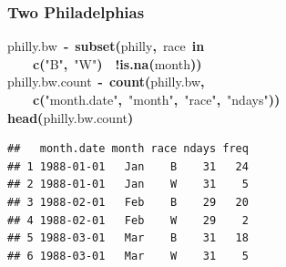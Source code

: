 \documentclass[]{beamer}
\makeatletter
\newcommand{\hlfunctioncall}[1]{\textcolor[rgb]{.5,0,.33}{\textbf{#1}}}%
\newcommand{\hlstring}[1]{\textcolor[rgb]{.6,.6,1}{#1}}%
\newcommand{\hlkeyword}[1]{\textbf{#1}}%
\newcommand{\hlassignement}[1]{\textbf{#1}}%
\newcommand{\hlsymbol}[1]{#1}%
\newcommand{\hlstd}[1]{\textcolor[rgb]{0,0,0}{#1}}%
\newenvironment{kframe}{%
 \def\FrameCommand##1{\hskip\@totalleftmargin \hskip-\fboxsep
 \colorbox{shadecolor}{##1}\hskip-\fboxsep
     \hskip-\linewidth \hskip-\@totalleftmargin \hskip\columnwidth}%
 \MakeFramed {\advance\hsize-\width
   \@totalleftmargin\z@ \linewidth\hsize
   \@setminipage}}%
 {\par\unskip\endMakeFramed}
\newenvironment{knitrout}{}{} %
\renewenvironment{knitrout}{\begin{footnotesize}}{\end{footnotesize}}
\makeatother
\begin{document}
\begin{frame}[fragile]
\frametitle{Two Philadelphias}
\begin{knitrout}
\color{fgcolor}\begin{kframe}
\begin{flushleft}
\ttfamily\noindent
\hlsymbol{philly.bw}{\ }\hlassignement{\usebox{\hlnormalsizeboxlessthan}-}{\ }\hlfunctioncall{subset}\hlkeyword{(}\hlsymbol{philly}\hlkeyword{,}{\ }\hlsymbol{race}{\ }\hlkeyword{\usebox{\hlnormalsizeboxpercent}in\usebox{\hlnormalsizeboxpercent}}\hspace*{\fill}\\
\hlstd{}{\ }{\ }{\ }{\ }\hlfunctioncall{c}\hlkeyword{(}\hlstring{"{}B"{}}\hlkeyword{,}{\ }\hlstring{"{}W"{}}\hlkeyword{)}{\ }\hlkeyword{\usebox{\hlnormalsizeboxand}}{\ }\hlkeyword{!}\hlfunctioncall{is.na}\hlkeyword{(}\hlsymbol{month}\hlkeyword{)}\hlkeyword{)}\hspace*{\fill}\\
\hlstd{}\hlsymbol{philly.bw.count}{\ }\hlassignement{\usebox{\hlnormalsizeboxlessthan}-}{\ }\hlfunctioncall{count}\hlkeyword{(}\hlsymbol{philly.bw}\hlkeyword{,}\hspace*{\fill}\\
\hlstd{}{\ }{\ }{\ }{\ }\hlfunctioncall{c}\hlkeyword{(}\hlstring{"{}month.date"{}}\hlkeyword{,}{\ }\hlstring{"{}month"{}}\hlkeyword{,}{\ }\hlstring{"{}race"{}}\hlkeyword{,}{\ }\hlstring{"{}ndays"{}}\hlkeyword{)}\hlkeyword{)}\hspace*{\fill}\\
\hlstd{}\hlfunctioncall{head}\hlkeyword{(}\hlsymbol{philly.bw.count}\hlkeyword{)}\mbox{}
\normalfont
\end{flushleft}
\begin{verbatim}
##   month.date month race ndays freq
## 1 1988-01-01   Jan    B    31   24
## 2 1988-01-01   Jan    W    31    5
## 3 1988-02-01   Feb    B    29   20
## 4 1988-02-01   Feb    W    29    2
## 5 1988-03-01   Mar    B    31   18
## 6 1988-03-01   Mar    W    31    5
\end{verbatim}
\end{kframe}
\end{knitrout}

\end{frame}
\end{document}
